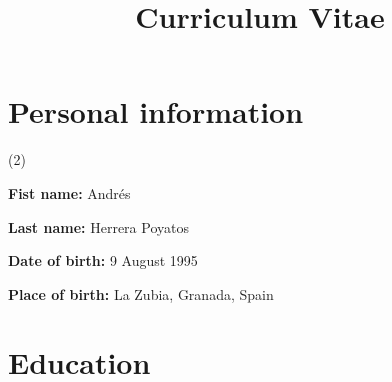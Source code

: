 \documentclass[10pt,a4paper,sans]{moderncv} %
\title{Curriculum Vitae}
\begin{document}
\makecvtitle %


\vspace*{-14mm}
\section{Personal information}

\begin{itemlist}[label=~](2)
\item \textbf{Fist name:} Andrés
\item* \textbf{Last name:} Herrera Poyatos
\item	\textbf{Date of birth:} 9 August 1995
\item *\textbf{Place of birth:} La Zubia, Granada, Spain
\end{itemlist}
\vspace*{-4mm}


\section{Education} \label{sec:education}

\end{document}
